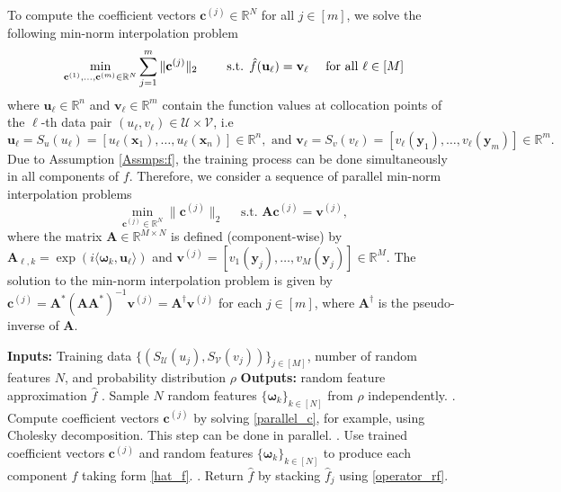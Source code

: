 \documentclass[11pt,twoside]{article}
\theoremstyle{plain}
\theoremstyle{definition}
\theoremstyle{remark}
\newcommand{\R}{\mathbb{R}}
\newcommand{\Ab}{\mathbf{A}}
\newcommand{\xb}{\mathbf{x}}
\newcommand{\yb}{\mathbf{y}}
\newcommand{\cb}{\mathbf{c}}
\newcommand{\ub}{\mathbf{u}}
\newcommand{\vb}{\mathbf{v}}
\newcommand{\Uc}{\mathcal{U}}
\newcommand{\Vc}{\mathcal{V}}
\newcommand{\omegab}{\boldsymbol\omega}
\begin{document}
To compute the coefficient vectors $\cb^{(j)}\in\R^N$ for all $j\in[m]$, we solve the following min-norm interpolation problem
\begin{equation}
\min_{\cb^{(1)},\dots,\cb^{(m)}\in\R^N} \sum_{j=1}^{m}\|\cb^{(j)}\|_2 \qquad\mbox{ s.t. } \Hat{f}(\ub_\ell) = \vb_\ell \quad \mbox{ for all } \ell\in[M]
\end{equation}
where $\ub_\ell\in\R^n$ and $\vb_\ell\in\R^m$ contain the function values at collocation points of the $\ell$-th data pair $(u_\ell,v_\ell)\in \Uc \times \Vc$, i.e 
\begin{equation*}
\ub_\ell = S_u(u_\ell) = [u_\ell(\xb_1), \dots, u_\ell(\xb_n)] \in\R^n, \mbox{ and } \vb_\ell = S_v(v_\ell) = [v_\ell(\yb_1), \dots, v_\ell(\yb_m)] \in\R^m.
\end{equation*}
Due to Assumption \ref{Assmps:f}, the training process can be done simultaneously in all components of $f$. 
Therefore, we consider a sequence of parallel min-norm interpolation problems
\begin{equation}
\label{parallel_c}
\min_{\cb^{(j)}\in\R^N} \|\cb^{(j)}\|_2 \quad\mbox{ s.t. } \Ab \cb^{(j)} = \vb^{(j)},
\end{equation}
where the matrix $\Ab\in\R^{M\times N}$ is defined (component-wise) by $\Ab_{\ell,k}=\exp(i\langle \omegab_k,\ub_\ell\rangle)$ and $\vb^{(j)} = [v_1(\yb_j),\dots,v_M(\yb_j)]\in\R^M$.
The solution to the min-norm interpolation problem is given by $\cb^{(j)} = \Ab^*(\Ab\Ab^*)^{-1}\vb^{(j)} = \Ab^\dagger \vb^{(j)}$ for each $j\in[m]$, where $\Ab^\dagger$ is the pseudo-inverse of $\Ab$.

\begin{algorithm}
\caption{Random Feature Operator Learning - Training}
\label{Alg:rf1}
\begin{algorithmic}
\State\textbf{Inputs:} Training data $\{ (S_\Uc(u_j), S_\Vc(v_j))\}_{j\in[M]}$, number of random features $N$, and probability distribution $\rho$
\State\textbf{Outputs:} random feature approximation $\hat{f}$
. Sample $N$ random features $\{ \omegab_k \}_{k\in[N]}$ from $\rho$ independently.
. Compute coefficient vectors $\cb^{(j)}$ by solving \eqref{parallel_c}, for example, using Cholesky decomposition. This step can be done in parallel.
. Use trained coefficient vectors $\cb^{(j)}$ and random features $\{ \omegab_k \}_{k\in[N]}$ to produce each component $\hat{f}$ taking form \eqref{hat_f}.
. Return $\hat{f}$ by stacking $\hat{f}_j$ using \eqref{operator_rf}.
\end{algorithmic}
\end{algorithm}
\end{document}
